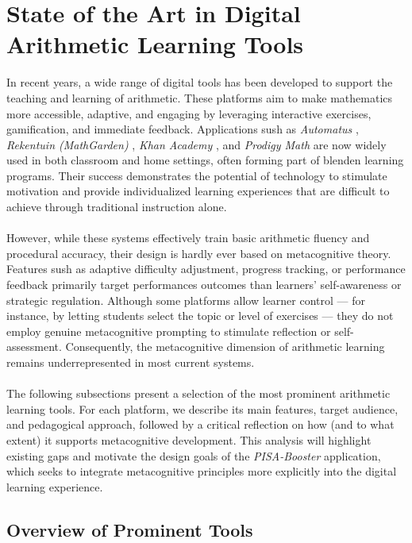 \section{State of the Art in Digital Arithmetic Learning Tools}
In recent years, a wide range of digital tools has been developed to support the teaching and learning of arithmetic. These platforms aim to make mathematics more accessible, adaptive, and engaging by leveraging interactive exercises, gamification, and immediate feedback. Applications sush as \textit{Automatus} \cite{automatus}, \textit{Rekentuin (MathGarden)} \cite{rekentuin}, \textit{Khan Academy} \cite{khan_academy_2025}, and \textit{Prodigy Math} \cite{prodigy_math} are now widely used in both classroom and home settings, often forming part of blenden learning programs. Their success demonstrates the potential of technology to stimulate motivation and provide individualized learning experiences that are difficult to achieve through traditional instruction alone.\\ \\
However, while these systems effectively train basic arithmetic fluency and procedural accuracy, their design is hardly ever based on metacognitive theory. Features sush as adaptive difficulty adjustment, progress tracking, or performance feedback primarily target performances outcomes than learners' self-awareness or strategic regulation. Although some platforms allow learner control --- for instance, by letting students select the topic or level of exercises --- they do not employ genuine metacognitive prompting to stimulate reflection or self-assessment. 
Consequently, the metacognitive dimension of arithmetic learning remains underrepresented in most current systems.\\ \\
The following subsections present a selection of the most prominent arithmetic learning tools. 
For each platform, we describe its main features, target audience, and pedagogical approach, followed by a critical reflection on how (and to what extent) it supports metacognitive development. 
This analysis will highlight existing gaps and motivate the design goals of the \textit{PISA-Booster} application, which seeks to integrate metacognitive principles more explicitly into the digital learning experience.

\subsection{Overview of Prominent Tools}
